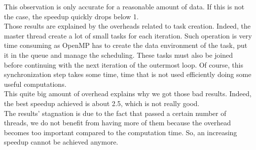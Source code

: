 This observation is only accurate for a reasonable amount of data. If this is not the case, the speedup quickly drops below 1.\\

Those results are explained by the overheads related to task creation. Indeed, the master thread create a lot of small tasks for each iteration. Such operation is very time consuming as OpenMP has to create the data environment of the task, put it in the queue and manage the scheduling.  These tasks must also be joined before continuing with the next iteration of the outermost loop. Of course, this synchronization step takes some time, time that is not used efficiently doing some useful computations.\\

This quite big amount of overhead explains why we got those bad results. Indeed, the best speedup achieved is about 2.5, which is not really good.\\

The results' stagnation is due to the fact that passed a certain number of threads, we do not benefit from having more of them because the overhead becomes too important compared to the computation time. So, an increasing speedup cannot be achieved anymore.
